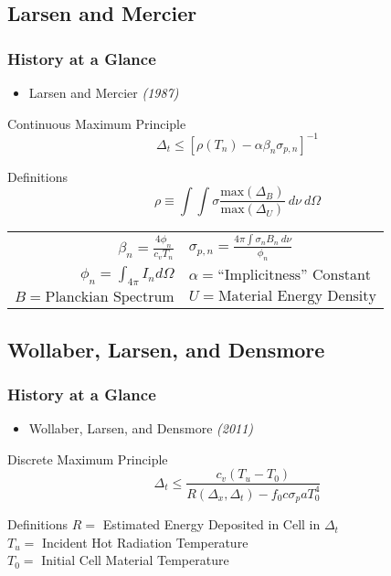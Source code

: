 \documentclass{beamer}
\begin{document}
\subsection{Larsen and Mercier}
\begin{frame}\frametitle{History at a Glance}
  \begin{itemize}
    \item Larsen and Mercier\; \emph{(1987)}
  \end{itemize}
\pause
\begin{exampleblock}{Continuous Maximum Principle}
\begin{equation*}
\Delta_t\leq \left[ \rho(T_n)-\alpha\beta_n\sigma_{p,n}\right]^{-1}
\end{equation*}
\end{exampleblock}

\begin{block}{Definitions}
\[\rho\equiv\int\int\sigma\frac{\mbox{max}(\Delta_B)}{\mbox{max}(\Delta_U)}\
    d\nu\ d\Omega\]
\begin{center}
\begin{tabular}{r l}
$\beta_n = \frac{4\phi_n}{c_v T_n}$ & %
    $\sigma_{p,n}=\frac{4\pi\int\sigma_nB_n\ d\nu}{\phi_n}$ \medskip\\
$\phi_n=\int_{4\pi}I_nd\Omega$ &
    $\alpha=\mbox{``Implicitness'' Constant}$\medskip\\
$B=\mbox{Planckian Spectrum}$ & $U=\mbox{Material Energy Density}$
\end{tabular}
\end{center}
\end{block}
\end{frame}


\subsection{Wollaber, Larsen, and Densmore}
\begin{frame}\frametitle{History at a Glance}
  \begin{itemize}
   \item Wollaber, Larsen, and Densmore\; \emph{(2011)}
  \end{itemize}
\pause
\begin{exampleblock}{Discrete Maximum Principle}
\begin{equation*}
\Delta_t\leq\frac{c_v(T_u-T_0)}{R(\Delta_x,\Delta_t)-f_0c\sigma_paT_0^4}
\end{equation*}
\end{exampleblock}
\begin{block}{Definitions}
$R=$ Estimated Energy Deposited in Cell in $\Delta_t$ \\
$T_u=$ Incident Hot Radiation Temperature \\
$T_0=$ Initial Cell Material Temperature
\end{block}
\end{frame}
\end{document}
